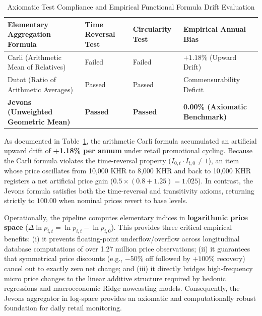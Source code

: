 \begin{table}[H]
\centering
\small
\setlength{\tabcolsep}{4pt}
\begin{tabularx}{\textwidth}{|>{\raggedright\arraybackslash}X|>{\centering\arraybackslash}p{2.6cm}|>{\centering\arraybackslash}p{2.4cm}|>{\centering\arraybackslash}p{3.2cm}|}
\hline
\rowcolor{blue!20}
\textbf{Elementary Aggregation Formula} & \textbf{Time Reversal Test} & \textbf{Circularity Test} & \textbf{Empirical Annual Bias} \\ \hline
Carli (Arithmetic Mean of Relatives) & Failed & Failed & $+1.18\%$ (Upward Drift) \\ \hline
Dutot (Ratio of Arithmetic Averages) & Passed & Passed & Commensurability Deficit \\ \hline
\textbf{Jevons (Unweighted Geometric Mean)} & \textbf{Passed} & \textbf{Passed} & \textbf{0.00\% (Axiomatic Benchmark)} \\ \hline
\end{tabularx}
\caption{Axiomatic Test Compliance and Empirical Functional Formula Drift Evaluation}
\label{tab:axiomatic_tests}
\end{table}

\hs As documented in Table~\ref{tab:axiomatic_tests}, the arithmetic Carli formula accumulated an artificial upward drift of \textbf{+1.18\% per annum} under retail promotional cycling. Because the Carli formula violates the time-reversal property ($I_{0, t} \cdot I_{t, 0} \neq 1$), an item whose price oscillates from 10{,}000 KHR to 8{,}000 KHR and back to 10{,}000 KHR registers a net artificial price gain ($0.5 \times (0.8 + 1.25) = 1.025$). In contrast, the Jevons formula satisfies both the time-reversal and transitivity axioms, returning strictly to $100.00$ when nominal prices revert to base levels.

\hs Operationally, the pipeline computes elementary indices in \textbf{logarithmic price space} ($\Delta \ln p_{i, t} = \ln p_{i, t} - \ln p_{i, 0}$). This provides three critical empirical benefits: (i) it prevents floating-point underflow/overflow across longitudinal database computations of over 1.27 million price observations; (ii) it guarantees that symmetrical price discounts (e.g., $-50\%$ off followed by $+100\%$ recovery) cancel out to exactly zero net change; and (iii) it directly bridges high-frequency micro price changes to the linear additive structure required by hedonic regressions and macroeconomic Ridge nowcasting models. Consequently, the Jevons aggregator in log-space provides an axiomatic and computationally robust foundation for daily retail monitoring.

